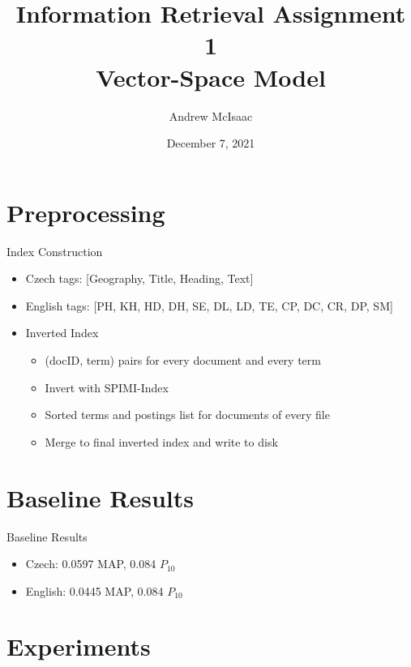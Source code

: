 \documentclass{beamer}
\title[Assignment 1]{Information Retrieval Assignment 1\\Vector-Space Model}
\author{Andrew McIsaac}
\date{December 7, 2021}
\begin{document}
\begin{frame}
  \titlepage
\end{frame}

\section{Preprocessing}

\begin{frame}{Index Construction}

\begin{itemize}
  \item Czech tags: [Geography, Title, Heading, Text]
  \item English tags: [PH, KH, HD, DH, SE, DL, LD, TE, CP, DC, CR, DP, SM]
  \item Inverted Index
	  \begin{itemize}
		\item (docID, term) pairs for every document and every term
		\item Invert with SPIMI-Index
	  	\item Sorted terms and postings list for documents of every file
		\item Merge to final inverted index and write to disk
	  \end{itemize}
\end{itemize}

\end{frame}

\section{Baseline Results}

\begin{frame}{Baseline Results}

\begin{itemize}
	\item Czech: 0.0597 MAP, 0.084 $P_{10}$
	\item English: 0.0445 MAP, 0.084 $P_{10}$
\end{itemize}

\end{frame}

\section{Experiments}
\end{document}
